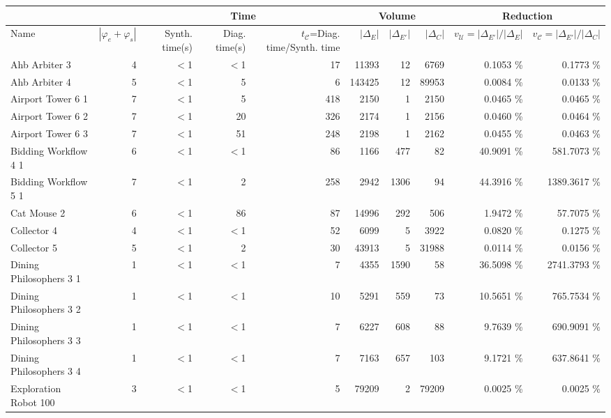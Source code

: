 \begin{tabular}{|l|r|rrr|rrr|rr|}
  \hline  & & \multicolumn{3}{c|}{Time}&\multicolumn{3}{c|}{Volume} & \multicolumn{2}{c|}{Reduction}\\ \hline
Name & $|\varphi_e + \varphi_s|$ & Synth. time(s) & Diag. time(s) & $t_{\mathcal{C}}$=Diag. time/Synth. time & $|\Delta_E|$ & $|\Delta_{E'}|$ & $|\Delta_{C}|$ & $v_{\mathcal{U}}=|\Delta_{E'}|/|\Delta_{E}|$ & $v_{\mathcal{C}}=|\Delta_{E'}|/|\Delta_{C}|$ \\ 
  \hline
Ahb Arbiter 3 &   4 & $<$1 & $<$1 & 17 & 11393 & 12 & 6769 &  0.1053 \% &    0.1773 \% \\ 
  Ahb Arbiter 4 &   5 & $<$1 & 5 & 6 & 143425 & 12 & 89953 &  0.0084 \% &    0.0133 \% \\ 
  Airport Tower 6 1 &   7 & $<$1 & 5 & 418 & 2150 & 1 & 2150 &  0.0465 \% &    0.0465 \% \\ 
  Airport Tower 6 2 &   7 & $<$1 & 20 & 326 & 2174 & 1 & 2156 &  0.0460 \% &    0.0464 \% \\ 
  Airport Tower 6 3 &   7 & $<$1 & 51 & 248 & 2198 & 1 & 2162 &  0.0455 \% &    0.0463 \% \\ 
  Bidding Workflow 4 1 &   6 & $<$1 & $<$1 & 86 & 1166 & 477 &  82 & 40.9091 \% &  581.7073 \% \\ 
  Bidding Workflow 5 1 &   7 & $<$1 & 2 & 258 & 2942 & 1306 &  94 & 44.3916 \% & 1389.3617 \% \\ 
  Cat Mouse 2 &   6 & $<$1 & 86 & 87 & 14996 & 292 & 506 &  1.9472 \% &   57.7075 \% \\ 
  Collector 4 &   4 & $<$1 & $<$1 & 52 & 6099 & 5 & 3922 &  0.0820 \% &    0.1275 \% \\ 
  Collector 5 &   5 & $<$1 & 2 & 30 & 43913 & 5 & 31988 &  0.0114 \% &    0.0156 \% \\ 
  Dining Philosophers 3 1 &   1 & $<$1 & $<$1 & 7 & 4355 & 1590 &  58 & 36.5098 \% & 2741.3793 \% \\ 
  Dining Philosophers 3 2 &   1 & $<$1 & $<$1 & 10 & 5291 & 559 &  73 & 10.5651 \% &  765.7534 \% \\ 
  Dining Philosophers 3 3 &   1 & $<$1 & $<$1 & 7 & 6227 & 608 &  88 &  9.7639 \% &  690.9091 \% \\ 
  Dining Philosophers 3 4 &   1 & $<$1 & $<$1 & 7 & 7163 & 657 & 103 &  9.1721 \% &  637.8641 \% \\ 
  Exploration Robot 100 &   3 & $<$1 & $<$1 & 5 & 79209 & 2 & 79209 &  0.0025 \% &    0.0025 \% \\ 

\end{tabular}
